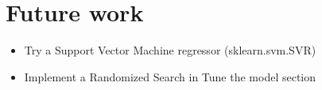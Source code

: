 \documentclass[11pt]{article}
\providecommand{\tightlist}{%
      \setlength{\itemsep}{0pt}\setlength{\parskip}{0pt}}
\begin{document}
    \hypertarget{future-work}{%
\section{Future work}\label{future-work}}

\begin{itemize}
\tightlist
\item
  Try a Support Vector Machine regressor (sklearn.svm.SVR)
\item
  Implement a Randomized Search in Tune the model section
\end{itemize}


    
    
    
\end{document}
